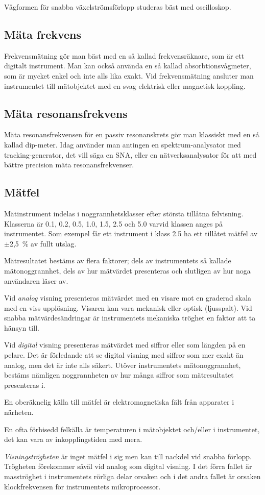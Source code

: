 Vågformen för snabba växelströmsförlopp studeras bäst med oscilloskop.

\subsection{Mäta frekvens}

Frekvensmätning gör man bäst med en så kallad frekvensräknare, som är ett
digitalt instrument.
Man kan också använda en så kallad absorbtionsvågmeter, som är mycket enkel och
inte alls lika exakt.
Vid frekvensmätning ansluter man instrumentet till mätobjektet med en
svag elektrisk eller magnetisk koppling.

\subsection{Mäta resonansfrekvens}

Mäta resonansfrekvensen för en passiv resonanskrets gör man klassiskt
med en så kallad dip-meter.
Idag använder man antingen en spektrum-analysator med tracking-generator,
det vill säga en SNA, eller en nätverksanalysator för att med bättre precision
mäta resonansfrekvenser.

\subsection{Mätfel}

Mätinstrument indelas i noggrannhetsklasser efter största tillåtna felvisning.
Klasserna är 0.1, 0.2, 0.5, 1.0, 1.5, 2.5 och 5.0 varvid klassen anges på
instrumentet.
Som exempel får ett instrument i klass 2.5 ha ett tillåtet mätfel av
\(\pm\)2,5~\% av fullt utslag.

Mätresultatet bestäms av flera faktorer; dels av instrumentets
så kallade mätonoggrannhet, dels av hur mätvärdet presenteras och slutligen
av hur noga användaren läser av.

Vid \emph{analog} visning presenteras mätvärdet med en visare mot en
graderad skala med en viss upplösning.
Visaren kan vara mekanisk eller optisk (ljusspalt).
Vid snabba mätvärdesändringar är instrumentets mekaniska tröghet en faktor
att ta hänsyn till.

Vid \emph{digital} visning presenteras mätvärdet med siffror eller som
längden på en pelare.
Det är förledande att se digital visning med siffror som mer exakt än analog,
men det är inte alls säkert.
Utöver instrumentets mätonoggrannhet, bestäms nämligen noggrannheten av hur
många siffror som mätresultatet presenteras i.

En oberäknelig källa till mätfel är elektromagnetiska fält från
apparater i närheten.

En ofta förbisedd felkälla är temperaturen i mätobjektet och/eller i
instrumentet, det kan vara av inkopplingstiden med mera.

\emph{Visningströgheten} är inget mätfel i sig men kan till nackdel
vid snabba förlopp.
Trögheten förekommer såväl vid analog som digital visning.
I det förra fallet är masströghet i instrumentets rörliga delar orsaken och i
det andra fallet är orsaken klockfrekvensen för instrumentets mikroprocessor.
